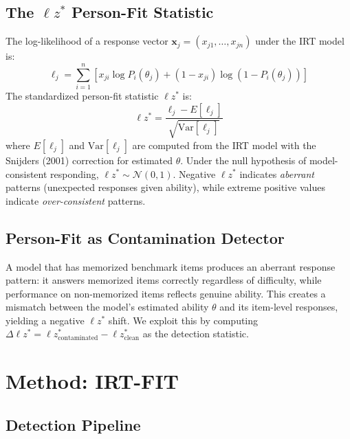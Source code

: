 \documentclass[11pt,a4paper]{article}
\begin{document}
\subsection{The $\ell z^*$ Person-Fit Statistic}

The log-likelihood of a response vector $\mathbf{x}_j = (x_{j1}, \ldots, x_{jn})$ under the IRT model is:
\begin{equation}
\ell_j = \sum_{i=1}^{n} \left[ x_{ji} \log P_i(\theta_j) + (1-x_{ji}) \log(1-P_i(\theta_j)) \right]
\end{equation}
The standardized person-fit statistic $\ell z^*$ \citep{drasgow1985appropriateness,snijders2001} is:
\begin{equation}
\ell z^* = \frac{\ell_j - E[\ell_j]}{\sqrt{\text{Var}[\ell_j]}}
\end{equation}
where $E[\ell_j]$ and $\text{Var}[\ell_j]$ are computed from the IRT model with the Snijders (2001) correction for estimated $\theta$.
Under the null hypothesis of model-consistent responding, $\ell z^* \sim \mathcal{N}(0,1)$.
Negative $\ell z^*$ indicates \emph{aberrant} patterns (unexpected responses given ability), while extreme positive values indicate \emph{over-consistent} patterns.

\subsection{Person-Fit as Contamination Detector}

A model that has memorized benchmark items produces an aberrant response pattern: it answers memorized items correctly regardless of difficulty, while performance on non-memorized items reflects genuine ability.
This creates a mismatch between the model's estimated ability $\theta$ and its item-level responses, yielding a negative $\ell z^*$ shift.
We exploit this by computing $\Delta \ell z^* = \ell z^*_{\text{contaminated}} - \ell z^*_{\text{clean}}$ as the detection statistic.

\section{Method: \textsc{IRT-FIT}}
\label{sec:method}

\subsection{Detection Pipeline}
\end{document}
